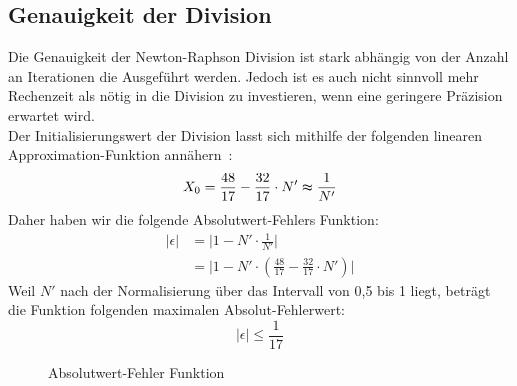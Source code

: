 \documentclass[course=erap]{aspdoc}
\begin{document}
\subsection{Genauigkeit der Division}
Die Genauigkeit der Newton-Raphson Division ist stark abhängig von der Anzahl an Iterationen die Ausgeführt werden.
Jedoch ist es auch nicht sinnvoll mehr Rechenzeit als nötig in die Division zu investieren, wenn eine geringere Präzision erwartet wird.\\
Der Initialisierungswert der Division lasst sich mithilfe der folgenden linearen Approximation-Funktion annähern~\cite{linear-approximation}:
\begin{equation*}
    X_0 = \frac{48}{17} - \frac{32}{17} \cdot N' \thickapprox \frac{1}{N'}
\end{equation*}
Daher haben wir die folgende Absolutwert-Fehlers Funktion:
\begin{equation*}
    \begin{split}
        \lvert \epsilon \rvert & = \lvert 1 - N' \cdot \frac{1}{N'} \rvert \\
        & = \lvert 1 - N' \cdot (\frac{48}{17} - \frac{32}{17} \cdot N') \rvert
    \end{split}
\end{equation*}
Weil $N'$ nach der Normalisierung über das Intervall von 0,5 bis 1 liegt, beträgt die Funktion folgenden maximalen Absolut-Fehlerwert:
\begin{equation*}
    \lvert \epsilon \rvert \leq \frac{1}{17}
\end{equation*}
\begin{figure}[H]
    \centering
    \caption{Absolutwert-Fehler Funktion}
\end{figure}
\end{document}
